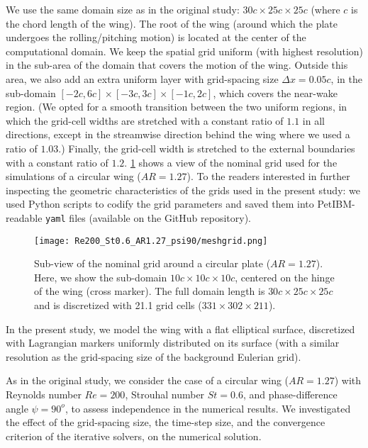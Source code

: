 We use the same domain size as in the original study: $30c \times 25c \times 25c$ (where $c$ is the chord length of the wing).
The root of the wing (around which the plate undergoes the rolling/pitching motion) is located at the center of the computational domain.
We keep the spatial grid uniform (with highest resolution) in the sub-area of the domain that covers the motion of the wing.
Outside this area, we also add an extra uniform layer with grid-spacing size $\Delta x = 0.05c$, in the sub-domain $\left[ -2c, 6c \right] \times \left[ -3c, 3c \right] \times \left[ -1c, 2c \right]$, which covers the near-wake region.
(We opted for a smooth transition between the two uniform regions, in which the grid-cell widths are stretched with a constant ratio of $1.1$ in all directions, except in the streamwise direction behind the wing where we used a ratio of $1.03$.)
Finally, the grid-cell width is stretched to the external boundaries with a constant ratio of $1.2$.
\cref{fig:nominal_grid} shows a view of the nominal grid used for the simulations of a circular wing ($AR = 1.27$).
To the readers interested in further inspecting the geometric characteristics of the grids used in the present study: we used Python scripts to codify the grid parameters and saved them into PetIBM-readable \texttt{yaml} files (available on the GitHub repository).

\begin{figure}[!h]
  \centering
  \texttt{[image: Re200\_St0.6\_AR1.27\_psi90/meshgrid.png]}
  \caption{Sub-view of the nominal grid around a circular plate ($AR = 1.27$). Here, we show the sub-domain $10c \times 10c \times 10c$, centered on the hinge of the wing (cross marker). The full domain length is $30c \times 25c \times 25c$ and is discretized with 21.1 grid cells ($331 \times 302 \times 211$).}
  \label{fig:nominal_grid}
\end{figure}

In the present study, we model the wing with a flat elliptical surface, discretized with Lagrangian markers uniformly distributed on its surface (with a similar resolution as the grid-spacing size of the background Eulerian grid).

As in the original study, we consider the case of a circular wing ($AR = 1.27$) with Reynolds number $Re = 200$, Strouhal number $St = 0.6$, and phase-difference angle $\psi = 90^o$, to assess independence in the numerical results.
We investigated the effect of the grid-spacing size, the time-step size, and the convergence criterion of the iterative solvers, on the numerical solution.


